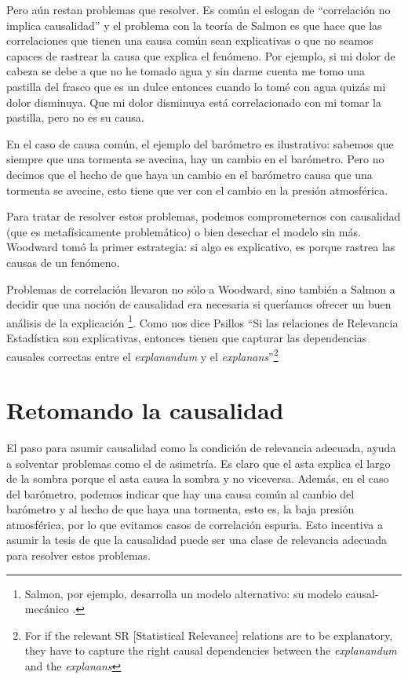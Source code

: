 {Pero aún restan problemas que resolver. Es común el eslogan de ``correlación no implica causalidad'' y el problema con la teoría de Salmon es que hace que las correlaciones que tienen una causa común sean explicativas o que no seamos capaces de rastrear la causa que explica el fenómeno. Por ejemplo, si mi dolor de cabeza se debe a que no he tomado agua y sin darme cuenta me tomo una pastilla del frasco que es un dulce entonces cuando lo tomé con agua quizás mi dolor disminuya. Que mi dolor disminuya está correlacionado con mi tomar la pastilla, pero no es su causa.

En el caso de causa común, el ejemplo del barómetro es ilustrativo: sabemos que siempre que una tormenta se avecina, hay un cambio en el barómetro. Pero no decimos que el hecho de que haya un cambio en el barómetro causa que una tormenta se avecine, esto tiene que ver con el cambio en la presión atmosférica.

Para tratar de resolver estos problemas, podemos comprometernos con causalidad (que es metafísicamente problemático) o bien desechar el modelo sin más. Woodward tomó la primer estrategia: si algo es explicativo, es porque rastrea las causas de un fenómeno.

Problemas de correlación llevaron no sólo a Woodward, sino también a Salmon a decidir que una noción de causalidad era necesaria si queríamos ofrecer un buen análisis de la explicación \footnote{Salmon, por ejemplo, desarrolla un modelo alternativo: su modelo causal-mecánico \cite{Salmon1994}.}. Como nos dice Psillos ``Si las relaciones de Relevancia Estadística son explicativas, entonces tienen que capturar las dependencias causales correctas entre el \textit{explanandum} y el \textit{explanans}''\footnote{For if the relevant SR [Statistical Relevance] relations are to be explanatory, they have to capture the right causal dependencies between the \textit{explanandum} and the \textit{explanans}} \cite[p. 255]{Psillos2009}

\section{Retomando la causalidad}

\noindent El paso para asumir causalidad como la condición de relevancia adecuada, ayuda a solventar problemas como el de asimetría. Es claro que el asta explica el largo de la sombra porque el asta causa la sombra y no viceversa. Además, en el caso del barómetro, podemos indicar que hay una causa común al cambio del barómetro y al hecho de que haya una tormenta, esto es, la baja presión atmosférica, por lo que evitamos casos de correlación espuria. Esto incentiva a asumir la tesis de que la causalidad puede ser una clase de relevancia adecuada para resolver estos problemas.

}
